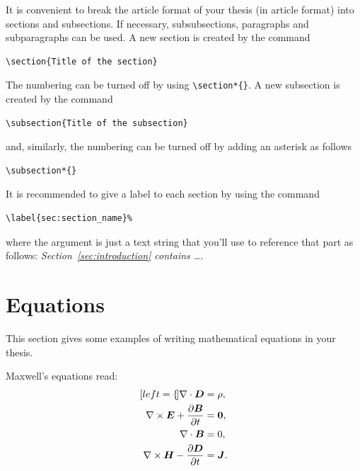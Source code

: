 \documentclass[11pt,a4paper]{article}
\begin{document}
It is convenient to break the article format of your thesis (in article format) into sections and subsections.
If necessary, subsubsections, paragraphs and subparagraphs can be used.
A new section is created by the command
\begin{verbatim}
\section{Title of the section}
\end{verbatim}
The numbering can be turned off by using \verb|\section*{}|.
A new subsection is created by the command
\begin{verbatim}
\subsection{Title of the subsection}
\end{verbatim}
and, similarly, the numbering can be turned off by adding an asterisk as follows
\begin{verbatim}
\subsection*{}
\end{verbatim}
It is recommended to give a label to each section by using the command
\begin{verbatim}
\label{sec:section_name}%
\end{verbatim}
where the argument is just a text string that you'll use to reference that part
as follows: \textit{Section~\ref{sec:introduction} contains   \dots}.

\section{Equations}
\label{sec:eqs}
This section gives some examples of writing mathematical equations in your thesis.

Maxwell's equations read:
\begin{subequations}
\label{eq:maxwell}
\begin{align}[left=\empheqlbrace]
\nabla\cdot \bm{D} & = \rho, \label{eq:maxwell1} \\
\nabla \times \bm{E} +  \frac{\partial \bm{B}}{\partial t} & = \bm{0}, \label{eq:maxwell2} \\
\nabla\cdot \bm{B} & = 0, \label{eq:maxwell3} \\
\nabla \times \bm{H} - \frac{\partial \bm{D}}{\partial t} &= \bm{J}. \label{eq:maxwell4}
\end{align}
\end{subequations}
\end{document}
